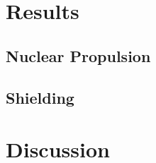 \documentclass[12pt,a4paper]{report}
\begin{document}
\chapter{Results}

\section{Nuclear Propulsion}
\section{Shielding}


\chapter{Discussion}






\end{document}
